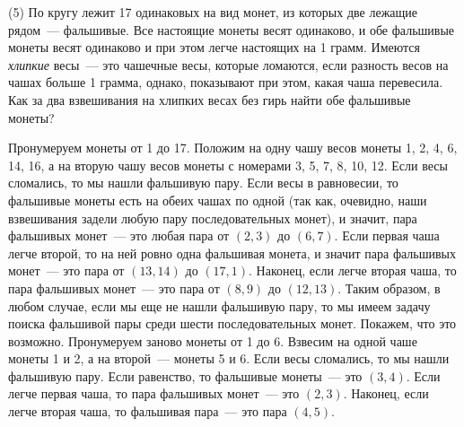 \textsf{(5)}
По кругу лежит 17 одинаковых на вид монет, из которых две лежащие рядом~---
фальшивые.
Все настоящие монеты весят одинаково, и обе фальшивые монеты весят одинаково и
при этом легче настоящих на 1 грамм.
Имеются \emph{хлипкие} весы~--- это чашечные весы, которые ломаются, если
разность весов на чашах больше 1 грамма, однако, показывают при этом, какая
чаша перевесила.
Как за два взвешивания на хлипких весах без гирь найти обе фальшивые монеты?

\solution
Пронумеруем монеты от 1 до 17.
Положим на одну чашу весов монеты 1, 2, 4, 6, 14, 16,
а на вторую чашу весов монеты с номерами 3, 5, 7, 8, 10, 12.
Если весы сломались, то мы нашли фальшивую пару.
Если весы в равновесии, то фальшивые монеты есть на обеих чашах по одной
(так как, очевидно, наши взвешивания задели любую пару последовательных монет),
и значит, пара фальшивых монет~--- это любая пара от $(2, 3)$ до $(6, 7)$.
Если первая чаша легче второй, то на ней ровно одна фальшивая монета,
и значит пара фальшивых монет~--- это пара от $(13, 14)$ до $(17, 1)$.
Наконец, если легче вторая чаша, то пара фальшивых монет~--- это пара
от $(8, 9)$ до $(12, 13)$.
Таким образом, в любом случае, если мы еще не нашли фальшивую пару, то мы имеем
задачу поиска фальшивой пары среди шести последовательных монет.
Покажем, что это возможно.
Пронумеруем заново монеты от 1 до 6.
Взвесим на одной чаше монеты 1 и 2, а на второй~--- монеты 5 и 6.
Если весы сломались, то мы нашли фальшивую пару.
Если равенство, то фальшивые монеты~--- это $(3, 4)$.
Если легче первая чаша, то пара фальшивых монет~--- это $(2, 3)$.
Наконец, если легче вторая чаша, то фальшивая пара~--- это пара $(4, 5)$.

